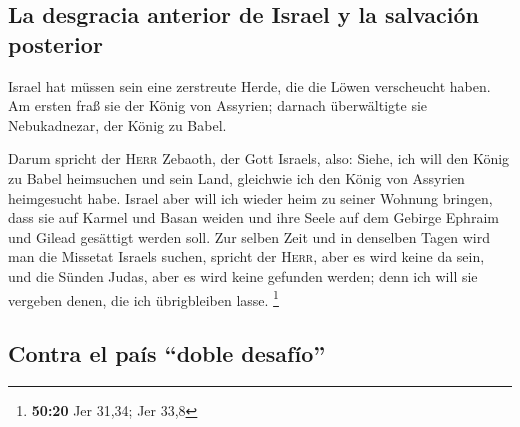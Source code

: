 \hypertarget{la-desgracia-anterior-de-israel-y-la-salvaciuxf3n-posterior}{%
\subsection{La desgracia anterior de Israel y la salvación
posterior}\label{la-desgracia-anterior-de-israel-y-la-salvaciuxf3n-posterior}}

 Israel hat müssen sein eine zerstreute Herde, die die
Löwen verscheucht haben. Am ersten fraß sie der König von Assyrien;
darnach überwältigte sie Nebukadnezar, der König zu Babel.

 Darum spricht der \textsc{Herr} Zebaoth, der Gott
Israels, also: Siehe, ich will den König zu Babel heimsuchen und sein
Land, gleichwie ich den König von Assyrien heimgesucht habe.
 Israel aber will ich wieder heim zu seiner Wohnung
bringen, dass sie auf Karmel und Basan weiden und ihre Seele auf dem
Gebirge Ephraim und Gilead gesättigt werden soll.  Zur
selben Zeit und in denselben Tagen wird man die Missetat Israels suchen,
spricht der \textsc{Herr}, aber es wird keine da sein, und die Sünden
Judas, aber es wird keine gefunden werden; denn ich will sie vergeben
denen, die ich übrigbleiben lasse. \footnote{\textbf{50:20} Jer 31,34;
  Jer 33,8}

\hypertarget{contra-el-pauxeds-doble-desafuxedo}{%
\subsection{Contra el país ``doble
desafío''}\label{contra-el-pauxeds-doble-desafuxedo}}

